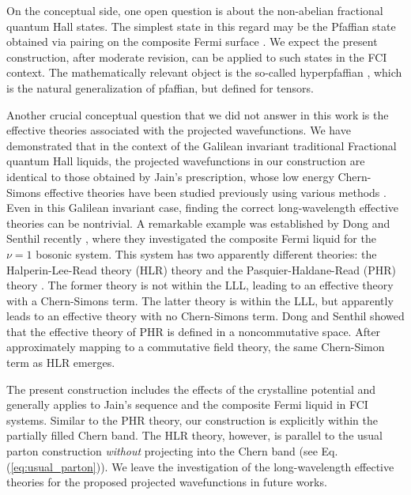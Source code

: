 On the conceptual side, one open question is about the non-abelian fractional quantum Hall states. The simplest state in this regard may be the Pfaffian state obtained via pairing on the composite Fermi surface \cite{moore1991nonabelions,lee2007particle,levin2007particle,son2015composite,read2000paired}. We expect the present construction, after moderate revision, can be applied to such states in the FCI context. The mathematically relevant object is the so-called hyperpfaffian \cite{aboud2016hyperpfaffians}, which is the natural generalization of pfaffian, but defined for tensors. 

Another crucial conceptual question that we did not answer in this work is the effective theories associated with the projected wavefunctions. We have demonstrated that in the context of the Galilean invariant traditional Fractional quantum Hall liquids, the projected wavefunctions in our construction are identical to those obtained by Jain's prescription, whose low energy Chern-Simons effective theories have been studied previously using various methods \cite{lopez1991fractional,zhang1992chern,lu2016classification,gromov2015framing,gromov2017bimetric,geracie2015spacetime,sohal2018chern,wen1999projective,barkeshli2010effective}. Even in this Galilean invariant case, finding the correct long-wavelength effective theories can be nontrivial. A remarkable example was established by Dong and Senthil recently \cite{dong2020noncommutative}, where they investigated the composite Fermi liquid for the $\nu=1$ bosonic system. This system has two apparently different theories: the Halperin-Lee-Read theory (HLR) theory \cite{halperin1993theory} and the Pasquier-Haldane-Read (PHR) theory \cite{pasquier1998dipole,read1998lowest}. The former theory is not within the LLL, leading to an effective theory with a Chern-Simons term. The latter theory is within the LLL, but apparently leads to an effective theory with no Chern-Simons term. Dong and Senthil showed that the effective theory of PHR is defined in a noncommutative space. After approximately mapping to a commutative field theory, the same Chern-Simon term as HLR emerges. 

The present construction includes the effects of the crystalline potential and generally applies to Jain's sequence and the composite Fermi liquid in FCI systems. Similar to the PHR theory, our construction is explicitly within the partially filled Chern band. The HLR theory, however, is parallel to the usual parton construction \emph{without} projecting into the Chern band (see Eq.(\ref{eq:usual_parton})). We leave the investigation of the long-wavelength effective theories for the proposed projected wavefunctions in future works. 


